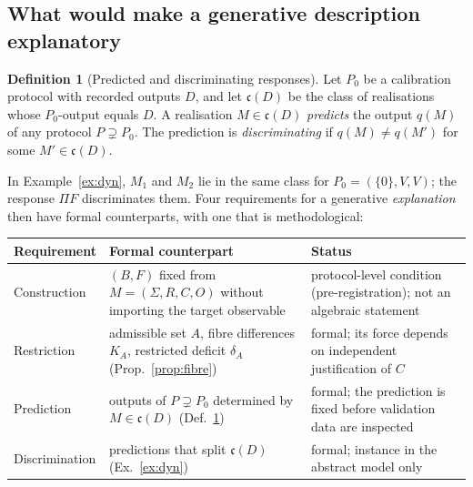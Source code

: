 \documentclass[11pt,a4paper]{article}
\newcommand{\defic}{\delta}
\theoremstyle{plain}
\theoremstyle{definition}
\newtheorem{definition}[theorem]{Definition}
\begin{document}
\subsection{What would make a generative description explanatory}
\begin{definition}[Predicted and discriminating responses]\label{def:predict}
Let $P_0$ be a calibration protocol with recorded outputs $D$, and let $\mathfrak c(D)$ be the class of realisations whose $P_0$-output equals $D$.
A realisation $M\in\mathfrak c(D)$ \emph{predicts} the output $q(M)$ of any protocol $P\supsetneq P_0$. The prediction is \emph{discriminating} if $q(M)\ne q(M')$ for some $M'\in\mathfrak c(D)$.
\end{definition}
In Example~\ref{ex:dyn}, $M_1$ and $M_2$ lie in the same class for $P_0=(\{0\},V,V)$; the response $\Pi F$ discriminates them.
Four requirements for a generative \emph{explanation} then have formal counterparts, with one that is methodological:
\begin{center}\small
\begin{tabularx}{\textwidth}{@{}l>{\raggedright\arraybackslash}X>{\raggedright\arraybackslash}X@{}}
\toprule
Requirement & Formal counterpart & Status\\
\midrule
Construction & $(B,F)$ fixed from $M=(\Sigma,R,C,O)$ without importing the target observable & protocol-level condition (pre-registration); not an algebraic statement\\
Restriction & admissible set $A$, fibre differences $K_A$, restricted deficit $\defic_A$ (Prop.~\ref{prop:fibre}) & formal; its force depends on independent justification of $C$\\
Prediction & outputs of $P\supsetneq P_0$ determined by $M\in\mathfrak c(D)$ (Def.~\ref{def:predict}) & formal; the prediction is fixed before validation data are inspected\\
Discrimination & predictions that split $\mathfrak c(D)$ (Ex.~\ref{ex:dyn}) & formal; instance in the abstract model only\\
\bottomrule
\end{tabularx}
\end{center}
\end{document}

